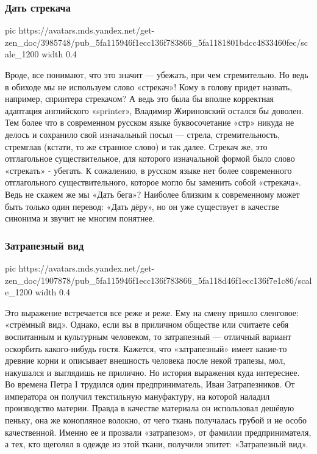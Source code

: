 \subsubsection{Дать стрекача}

\ifcmt
  pic https://avatars.mds.yandex.net/get-zen_doc/3985748/pub_5fa115946f1ecc136f783866_5fa1181801bdcc4833460fec/scale_1200
  width 0.4
\fi

Вроде, все понимают, что это значит — убежать, при чем стремительно. Но ведь в
обиходе мы не используем слово «стрекач»! Кому в голову придет назвать,
например, спринтера стрекачом? А ведь это была бы вполне корректная адаптация
английского «sprinter», Владимир Жириновский остался бы доволен. Тем более что
в современном русском языке буквосочетание «стр» никуда не делось и сохранило
свой изначальный посыл — стрела, стремительность, стремглав (кстати, то же
странное слово) и так далее. Стрекач же, это отглагольное существительное, для
которого изначальной формой было слово «стрекать» - убегать. К сожалению, в
русском языке нет более современного отглагольного существительного, которое
могло бы заменить собой «стрекача». Ведь не скажем же мы «Дать бега»? Наиболее
близким к современному может быть только один перевод: «Дать дёру», но он уже
существует в качестве синонима и звучит не многим понятнее.

\subsubsection{Затрапезный вид}


\ifcmt
  pic https://avatars.mds.yandex.net/get-zen_doc/1907878/pub_5fa115946f1ecc136f783866_5fa118d46f1ecc136f7e1c86/scale_1200
  width 0.4
\fi

Это выражение встречается все реже и реже. Ему на смену пришло сленговое:
«стрёмный вид». Однако, если вы в приличном обществе или считаете себя
воспитанным и культурным человеком, то затрапезный — отличный вариант оскорбить
какого-нибудь гостя. Кажется, что «затрапезный» имеет какие-то древние корни и
описывает внешность человека после некой трапезы, мол, накушался и выглядишь не
прилично. Но история выражения куда интереснее. Во времена Петра I трудился
один предприниматель, Иван Затрапезников. От императора он получил текстильную
мануфактуру, на которой наладил производство материи. Правда в качестве
материала он использовал дешёвую пеньку, она же конопляное волокно, от чего
ткань получалась грубой и не особо качественной. Именно ее и прозвали
«затрапезом», от фамилии предпринимателя, а тех, кто щеголял в одежде из этой
ткани, получили эпитет: «Затрапезный вид».

